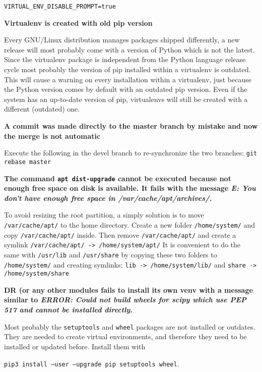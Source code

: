 \documentclass[a4paper,12pt]{article}
\begin{document}
{\tt VIRTUAL\_ENV\_DISABLE\_PROMPT=true}

\textbf{Virtualenv is created with old pip version}

Every GNU/Linux distribution manages packages shipped differently, a new release will most probably come with a version of Python which is not the latest. Since the virtualenv package is independent from the Python language release cycle most probably the version of pip installed within a virtualenv is outdated. This will cause a warning on every installation within a virtualenv, just because the Python version comes by default with an outdated pip version. Even if the system has an up-to-date version of pip, virtualenvs will still be created with a different (outdated) one.

\textbf{A commit was made directly to the master branch by mistake and now the merge is not automatic}

Execute the following in the devel branch to re-synchronize the two branches: {\tt git rebase master}

\textbf{The command {\tt apt dist-upgrade} cannot be executed because not enough free space on disk is available. It fails with the message \emph{E: You don't have enough free space in /var/cache/apt/archives/.}}

To avoid resizing the root partition, a simply solution is to move {\tt /var/cache/apt/} to the home directory.
Create a new folder {\tt /home/system/} and copy {\tt /var/cache/apt/} inside. Then remove {\tt /var/cache/apt/} and create a symlink {\tt /var/cache/apt/ -> /home/system/apt/}
It is convenient to do the same with {\tt /usr/lib} and {\tt /usr/share} by copying these two folders to {\tt /home/system/} and creating symlinks: {\tt lib -> /home/system/lib/} and {\tt share -> /home/system/share}

\textbf{DR (or any other modules fails to install its own venv with a message similar to \emph{ERROR: Could not build wheels for scipy which use PEP 517 and cannot be installed directly}.}

Most probably the {\tt setuptools} and {\tt wheel} packages are not installed or outdates. They are needed to create virtual environments, and therefore they need to be installed or updated before. Install them with

{\tt pip3 install --user --upgrade pip setuptools wheel}.





\end{document}
